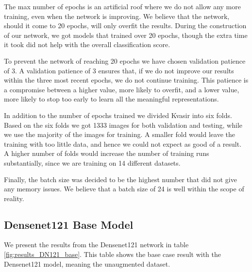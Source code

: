 The max number of epochs is an artificial roof where we do not allow any more training, even when the network is improving.  We believe that the network, should it come to 20 epochs, will only overfit the results. During the construction of our network, we got models that trained over 20 epochs, though the extra time it took did not help with the overall classification score.

To prevent the network of reaching 20 epochs we have chosen validation patience of 3. A validation patience of 3 ensures that, if we do not improve our results within the three most recent epochs, we do not continue training.  This patience is a compromise between a higher value, more likely to overfit, and a lower value, more likely to stop too early to learn all the meaningful representations. 

In addition to the number of epochs trained we divided Kvasir into six folds. Based on the six folds we got 1333 images for both validation and testing, while we use the majority of the images for training. A smaller fold would leave the training with too little data, and hence we could not expect as good of a result. A higher number of folds would increase the number of training runs substantially, since we are training on 14 different datasets.

Finally, the batch size was decided to be the highest number that did not give any memory issues.  We believe that a batch size of 24 is well within the scope of reality.

\FloatBarrier
\subsection{Densenet121 Base Model}
We present the results from the Densenet121 network in table \ref{fig:results_DN121_base}.
This table shows the base case result with the Densenet121 model, meaning the unaugmented dataset. 

